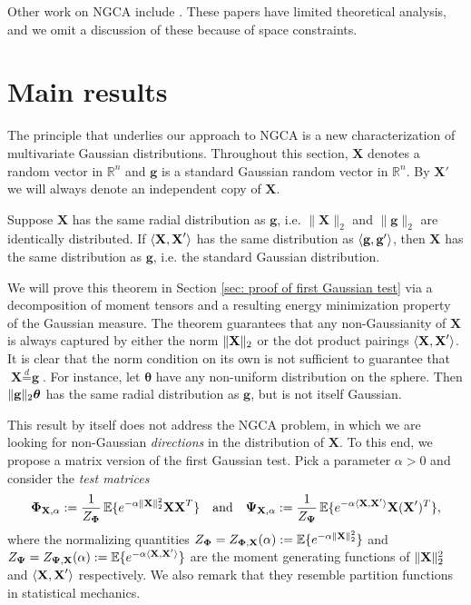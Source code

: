 \documentclass[final,12pt]{colt2018} %
\numberwithin{equation}{section}
\DeclarePairedDelimiter{\norm}{\lVert}{\rVert}
\DeclarePairedDelimiter{\braces}{\lbrace}{\rbrace}
\DeclarePairedDelimiter{\inprod}{\langle}{\rangle}
\newcommand{\E}{\mathbb{E}}
\newcommand{\R}{\mathbb{R}}
\newcommand{\boldg}{\textbf{g}}
\newcommand{\boldPhi}{\boldsymbol{\Phi}}
\newcommand{\boldPsi}{\boldsymbol{\Psi}}
\newcommand{\boldtheta}{\boldsymbol{\theta}}
\newcommand{\boldX}{\textbf{X}}
\begin{document}
Other work on NGCA include \cite{Kawanabe2005b,Kawanabe2006,Kawanabe2006b,Sasaki2016b}. These papers have limited theoretical analysis, and we omit a discussion of these because of space constraints.

\section{Main results} \label{sec: main results}

The principle that underlies our approach to NGCA is a new characterization 
of multivariate Gaussian distributions. 
Throughout this section, $\boldX$ denotes a random vector in $\R^n$
and $\boldg$ is a standard Gaussian random vector in $\R^n$.
By $\boldX'$ we will always denote an independent copy of $\boldX$.

\begin{theorem} \label{thm: first Gaussian test}
  Suppose $\boldX$ has the same radial distribution as $\boldg$, i.e. $\|\boldX\|_2$ and $\|\boldg\|_2$
  are identically distributed. If $\inprod{\boldX,\boldX'}$ has the same distribution 
  as $\inprod{\boldg,\boldg'}$, then $\boldX$ has the same distribution as $\boldg$, i.e. 
  the standard Gaussian distribution.
\end{theorem}

We will prove this theorem in Section \ref{sec: proof of first Gaussian test} 
via a decomposition of moment tensors and a resulting energy minimization property 
of the Gaussian measure. The theorem guarantees that any non-Gaussianity of $\boldX$ is always captured by 
either the norm $\norm{\boldX}_2$ or the dot product pairings $\inprod{\boldX,\boldX'}$. It is clear that the norm condition on its own is not sufficient to guarantee that $\boldX \stackrel{d}{=} \boldg$. For instance, let $\boldtheta$ have any non-uniform distribution on the sphere. Then $\norm{\boldg}_2\boldtheta$ has the same radial distribution as $\boldg$, but is not itself Gaussian.

This result by itself does not address the NGCA problem, in which 
we are looking for non-Gaussian {\em directions} in the distribution of $\boldX$.
To this end, we propose a matrix version of the first Gaussian test. 
Pick a parameter $\alpha>0$ and consider the {\em test matrices} 
\begin{equation}		\label{eq: test matrices}
	\boldPhi_{\boldX,\alpha} := \frac{1}{Z_{\boldPhi}} \, \E \braces{e^{-\alpha\norm{\boldX}_2^2} \boldX \boldX^T }
	\quad \text{and} \quad
	\boldPsi_{\boldX,\alpha} := \frac{1}{Z_{\boldPsi}} \, \E \braces{e^{-\alpha \inprod{\boldX,\boldX'}} \boldX (\boldX')^T},
\end{equation}
where the normalizing quantities $Z_{\boldPhi} = Z_{\boldPhi,\boldX}(\alpha):= \E\braces{e^{-\alpha\norm{\boldX}_2^2}}$ 
and $Z_{\boldPsi} = Z_{\boldPsi,\boldX}(\alpha) := \E\braces{e^{-\alpha \inprod{\boldX,\boldX'}}}$ are the moment generating functions of $\norm{\boldX}_2^2$ and $\inprod{\boldX,\boldX'}$ respectively. We also remark that they resemble partition functions in statistical mechanics.
\end{document}
